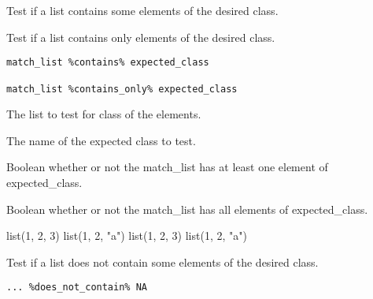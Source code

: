 \documentclass[a4paper]{book}
\begin{document}
%
\begin{Description}\relax
Test if a list contains some elements of the desired class.

Test if a list contains only elements of the desired class.
\end{Description}
%
\begin{Usage}
\begin{verbatim}
match_list %contains% expected_class

match_list %contains_only% expected_class
\end{verbatim}
\end{Usage}
%
\begin{Arguments}
\begin{ldescription}
\item[\code{match\_list.}] The list to test for class of the elements.

\item[\code{expected\_class.}] The name of the expected class to test.
\end{ldescription}
\end{Arguments}
%
\begin{Value}
Boolean whether or not the match\_list has at least one element of expected\_class.

Boolean whether or not the match\_list has all elements of expected\_class.
\end{Value}
%
\begin{Examples}
\begin{ExampleCode}
  list(1, 2, 3) %
  list(1, 2, "a") %
  list(1, 2, 3) %
  list(1, 2, "a") %
\end{ExampleCode}
\end{Examples}
%
\begin{Description}\relax
Test if a list does not contain some elements of the desired class.
\end{Description}
%
\begin{Usage}
\begin{verbatim}
... %does_not_contain% NA
\end{verbatim}
\end{Usage}
\end{document}
